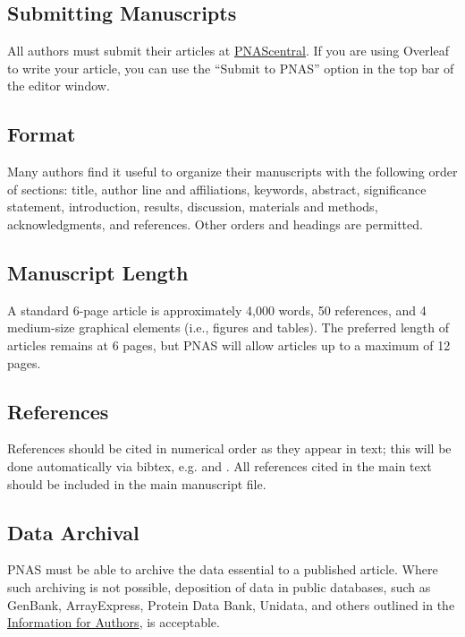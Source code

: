 \documentclass[9pt,twocolumn,twoside]{pnas-new}
\begin{document}
\subsection*{Submitting Manuscripts}

All authors must submit their articles at \href{http://www.pnascentral.org/cgi-bin/main.plex}{PNAScentral}. If you are using Overleaf to write your article, you can use the ``Submit to PNAS'' option in the top bar of the editor window.

\subsection*{Format}

Many authors find it useful to organize their manuscripts with the following order of sections: title, author line and affiliations, keywords, abstract, significance statement, introduction, results, discussion, materials and methods, acknowledgments, and references. Other orders and headings are permitted.

\subsection*{Manuscript Length}

A standard 6-page article is approximately 4,000 words, 50 references, and 4 medium-size graphical elements (i.e., figures and tables). The preferred length of articles remains at 6 pages, but PNAS will allow articles up to a maximum of 12 pages.

\subsection*{References}

References should be cited in numerical order as they appear in text; this will be done automatically via bibtex, e.g. \cite{belkin2002using} and \cite{berard1994embedding,coifman2005geometric,phdthesis,masterthesis}. All references cited in the main text should be included in the main manuscript file.

\subsection*{Data Archival}

PNAS must be able to archive the data essential to a published article. Where such archiving is not possible, deposition of data in public databases, such as GenBank, ArrayExpress, Protein Data Bank, Unidata, and others outlined in the \href{https://www.pnas.org/author-center/editorial-and-journal-policies#materials-and-data-availability}{Information for Authors}, is acceptable.
\end{document}
